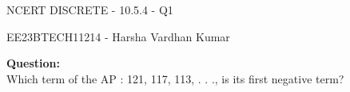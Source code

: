 \documentclass{article}
\begin{document}
\vspace{3cm}
\begin{center}
  \Huge{NCERT DISCRETE - 10.5.4 - Q1}
\end{center}
\begin{center}
    \Large {EE23BTECH11214 - Harsha Vardhan Kumar}
\end{center}
\bigskip
\begin{paracol}{2}
\begin{leftcolumn}
\noindent
\noindent\textbf{Question:}
\\ Which term of the AP : 121, 117, 113, . . ., is
its first negative term?
\end{leftcolumn}
\end{paracol}
\end{document}
